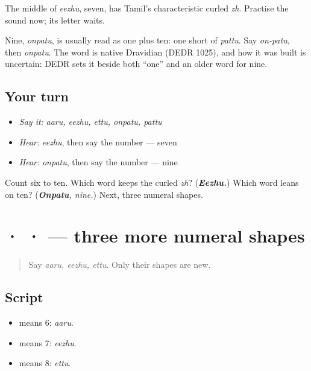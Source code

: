 \begin{culture}
The middle of \emph{eezhu}, seven, has Tamil's characteristic curled \emph{zh}. Practise the sound now; its letter waits.
\end{culture}

\begin{cousinweb}
Nine, \emph{onpatu}, is usually read as one plus ten: one short of \emph{pattu}. Say \emph{on-patu}, then \emph{onpatu}. The word is native Dravidian (DEDR 1025), and how it was built is uncertain: DEDR sets it beside both \textquotedblleft{}one\textquotedblright{} and an older word for nine.
\end{cousinweb}

\subsection*{Your turn}
\begin{itemize}
\raggedright
  \item \emph{Say it:} \emph{aaru, eezhu, ettu, onpatu, pattu}
  \item \emph{Hear:} \emph{eezhu}, then say the number — seven
  \item \emph{Hear:} \emph{onpatu}, then say the number — nine
\end{itemize}

\begin{tcolorbox}[breakable,colback=teal!4,colframe=teal!35!black,title={Before you move on}]
Count six to ten. Which word keeps the curled \emph{zh}? (\emph{\textbf{Eezhu.}}) Which word leans on ten? (\emph{\textbf{Onpatu}, nine.}) Next, three numeral shapes.
\end{tcolorbox}
\section[\texorpdfstring{\ta{௬} \ta{௭} \ta{௮} (six, seven, eight)}{௬ ௭ ௮ (six, seven, eight)}]{ ·  ·  — three more numeral shapes}

\label{lesson:TA-W07-digits-6-8}



\begin{quote}
Say \emph{aaru, eezhu, ettu}. Only their shapes are new.
\end{quote}

\subsection*{Script}
\begin{itemize}
\raggedright
  \item \textbf{} means 6: \emph{aaru}.
  \item \textbf{} means 7: \emph{eezhu}.
  \item \textbf{} means 8: \emph{ettu}.
\end{itemize}

